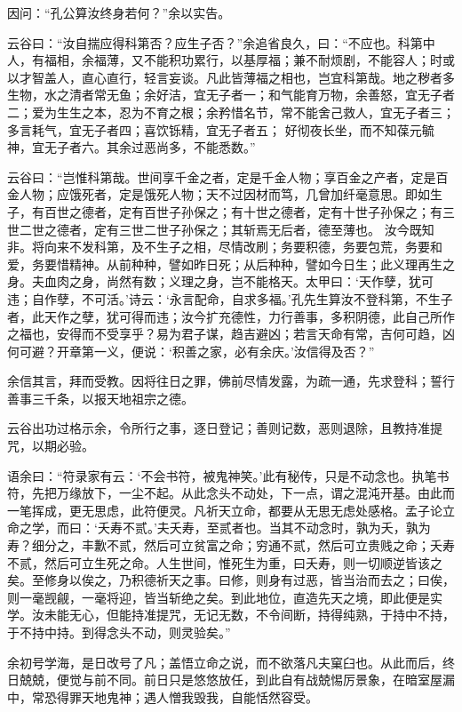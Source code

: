 \documentclass[letterpaper,12pt,english]{sphinxmanual}
\begin{document}
因问：“孔公算汝终身若何？”余以实告。

云谷曰：“汝自揣应得科第否？应生子否？”余追省良久，曰：“不应也。科第中人，有福相，余福薄，又不能积功累行，以基厚福；兼不耐烦剧，不能容人；时或以才智盖人，直心直行，轻言妄谈。凡此皆薄福之相也，岂宜科第哉。地之秽者多生物，水之清者常无鱼；余好洁，宜无子者一；和气能育万物，余善怒，宜无子者二；爱为生生之本，忍为不育之根；余矜惜名节，常不能舍己救人，宜无子者三； 多言耗气，宜无子者四；喜饮铄精，宜无子者五； 好彻夜长坐，而不知葆元毓神，宜无子者六。其余过恶尚多，不能悉数。”

云谷曰：“岂惟科第哉。世间享千金之者，定是千金人物；享百金之产者，定是百金人物；应饿死者，定是饿死人物；天不过因材而笃，几曾加纤毫意思。即如生子，有百世之德者，定有百世子孙保之；有十世之德者，定有十世子孙保之；有三世二世之德者，定有三世二世子孙保之；其斩焉无后者，德至薄也。 汝今既知非。将向来不发科第，及不生子之相，尽情改刷；务要积德，务要包荒，务要和爱，务要惜精神。从前种种，譬如昨日死；从后种种，譬如今日生；此义理再生之身。夫血肉之身，尚然有数；义理之身，岂不能格天。太甲曰：‘天作孽，犹可违；自作孽，不可活。’诗云：‘永言配命，自求多福。’孔先生算汝不登科第，不生子者，此天作之孽，犹可得而违；汝今扩充德性，力行善事，多积阴德，此自己所作之福也，安得而不受享乎？易为君子谋，趋吉避凶；若言天命有常，吉何可趋，凶何可避？开章第一义，便说：‘积善之家，必有余庆。’汝信得及否？”

余信其言，拜而受教。因将往日之罪，佛前尽情发露，为疏一通，先求登科；誓行善事三千条，以报天地祖宗之德。

云谷出功过格示余，令所行之事，逐日登记；善则记数，恶则退除，且教持准提咒，以期必验。

语余曰：“符录家有云：‘不会书符，被鬼神笑。’此有秘传，只是不动念也。执笔书符，先把万缘放下，一尘不起。从此念头不动处，下一点，谓之混沌开基。由此而一笔挥成，更无思虑，此符便灵。凡祈天立命，都要从无思无虑处感格。孟子论立命之学，而曰：‘夭寿不贰。’夫夭寿，至贰者也。当其不动念时，孰为夭，孰为寿？细分之，丰歉不贰，然后可立贫富之命；穷通不贰，然后可立贵贱之命；夭寿不贰，然后可立生死之命。人生世间，惟死生为重，曰夭寿，则一切顺逆皆该之矣。至修身以俟之，乃积德祈天之事。曰修，则身有过恶，皆当治而去之；曰俟，则一毫觊觎，一毫将迎，皆当斩绝之矣。到此地位，直造先天之境，即此便是实学。汝未能无心，但能持准提咒，无记无数，不令间断，持得纯熟，于持中不持，于不持中持。到得念头不动，则灵验矣。”

余初号学海，是日改号了凡；盖悟立命之说，而不欲落凡夫窠臼也。从此而后，终日兢兢，便觉与前不同。前日只是悠悠放任，到此自有战兢惕厉景象，在暗室屋漏中，常恐得罪天地鬼神；遇人憎我毁我，自能恬然容受。
\end{document}
